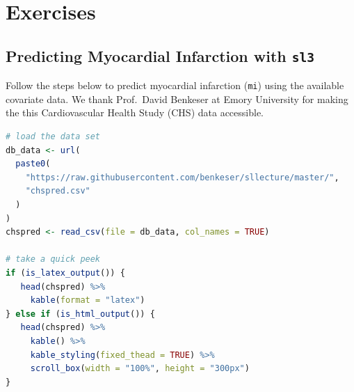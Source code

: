 \documentclass[
  12pt, krantz2,
]{book}
\newcommand{\passthrough}[1]{#1}
\theoremstyle{definition}
\theoremstyle{definition}
\theoremstyle{definition}
\newcommand{\1}{\mathbbm{1}}
\begin{document}
\hypertarget{sl3-exercises}{%
\section{Exercises}\label{sl3-exercises}}

\hypertarget{sl3ex1}{%
\subsection{\texorpdfstring{Predicting Myocardial Infarction with \texttt{sl3}}{Predicting Myocardial Infarction with sl3}}\label{sl3ex1}}

Follow the steps below to predict myocardial infarction (\passthrough{\lstinline!mi!}) using the
available covariate data. We thank Prof.~David Benkeser at Emory University for
making the this Cardiovascular Health Study (CHS) data accessible.

\begin{lstlisting}[language=R]
# load the data set
db_data <- url(
  paste0(
    "https://raw.githubusercontent.com/benkeser/sllecture/master/",
    "chspred.csv"
  )
)
chspred <- read_csv(file = db_data, col_names = TRUE)

# take a quick peek
if (is_latex_output()) {
   head(chspred) %>%
     kable(format = "latex")
} else if (is_html_output()) {
   head(chspred) %>%
     kable() %>%
     kable_styling(fixed_thead = TRUE) %>%
     scroll_box(width = "100%", height = "300px")
}
\end{lstlisting}
\end{document}
